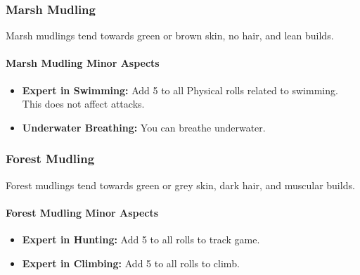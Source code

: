 \begin{multicols}{2}
\subsubsection{Marsh Mudling}

Marsh mudlings tend towards green or brown skin, no hair, and lean builds.

\paragraph{Marsh Mudling Minor Aspects}

\begin{itemize}
    \item \textbf{Expert in Swimming:} Add 5 to all Physical rolls related to swimming. This does not affect attacks.
    \item \textbf{Underwater Breathing:} You can breathe underwater.
\end{itemize}

\subsubsection{Forest Mudling}

Forest mudlings tend towards green or grey skin, dark hair, and muscular builds.

\paragraph{Forest Mudling Minor Aspects}

\begin{itemize}
    \item \textbf{Expert in Hunting:} Add 5 to all rolls to track game.
    \item \textbf{Expert in Climbing:} Add 5 to all rolls to climb.
\end{itemize}

\end{multicols}
